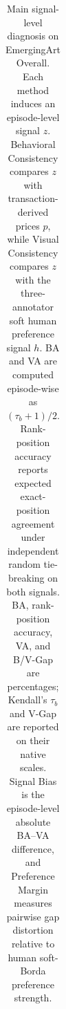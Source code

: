 \begin{table}[t]
{\begin{tabular}{lcccccccccccccc}
\bottomrule
\end{tabular}%
}
\caption{Main signal-level diagnosis on EmergingArt Overall. Each method induces an episode-level signal $z$. Behavioral Consistency compares $z$ with transaction-derived prices $p$, while Visual Consistency compares $z$ with the three-annotator soft human preference signal $h$. BA and VA are computed episode-wise as $(\tau_b+1)/2$. Rank-position accuracy reports expected exact-position agreement under independent random tie-breaking on both signals. BA, rank-position accuracy, VA, and B/V-Gap are percentages; Kendall's $\tau_b$ and V-Gap are reported on their native scales. Signal Bias is the episode-level absolute BA--VA difference, and Preference Margin measures pairwise gap distortion relative to human soft-Borda preference strength.}
\label{tab:emergingart_signal_diagnosis}
\end{table}
